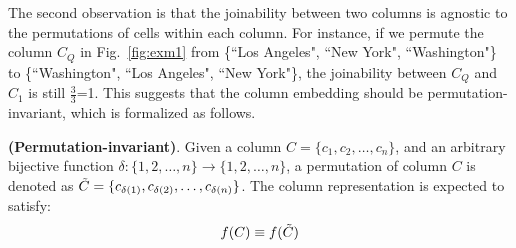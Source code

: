 
 




The second observation is that the joinability between two columns is agnostic to the permutations of cells within each column. For instance, if we permute the column  $C_Q$  in Fig.~\ref{fig:exm1} from \{``Los Angeles", ``New York", ``Washington"\} to \{``Washington", ``Los Angeles", ``New York"\}, the joinability between $C_Q$  and $C_1$ is still $\frac{3}{3}$=1. This suggests that the column embedding should be permutation-invariant, which is formalized as follows.
\begin{myProp}
\label{prop:2}
\textnormal{\textbf{(Permutation-invariant)}.} 
Given a column $C = \{c_1, c_2, \dots, c_n \}$, and an arbitrary bijective function $\delta: \{1, 2, \dots, n\} \rightarrow \{1, 2, \dots, n\}$, a permutation of column $C$ is denoted as $\Tilde{C} = \{c_{\delta(1)}, c_{\delta(2)}, \dots, c_{\delta(n)} \}$. The column representation is expected to satisfy:
\begin{equation}
    f(C) \equiv f(\Tilde{C}) 
\end{equation}
\end{myProp}



